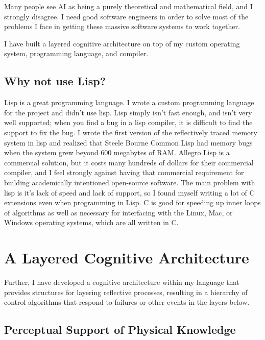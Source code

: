 Many people see AI as being a purely theoretical and mathematical
field, and I strongly disagree.  I need good software engineers in
order to solve most of the problems I face in getting these massive
software systems to work together.

I have built a layered cognitive architecture on top of my custom
operating system, programming language, and compiler.

\subsection{Why not use Lisp?}

Lisp is a great programming language.  I wrote a custom programming
language for the project and didn't use lisp.  Lisp simply isn't fast
enough, and isn't very well supported; when you find a bug in a lisp
compiler, it is difficult to find the support to fix the bug.  I wrote
the first version of the reflectively traced memory system in lisp and
realized that Steele Bourne Common Lisp had memory bugs when the
system grew beyond 600 megabytes of RAM.  Allegro Lisp is a commercial
solution, but it costs many hundreds of dollars for their commercial
compiler, and I feel strongly against having that commercial
requirement for building academically intentioned open-source
software.  The main problem with lisp is it's lack of speed and lack
of support, so I found myself writing a lot of C extensions even when
programming in Lisp.  C is good for speeding up inner loops of
algorithms as well as necessary for interfacing with the Linux, Mac,
or Windows operating systems, which are all written in C.

\section{A Layered Cognitive Architecture}

Further, I have developed a cognitive architecture within my
language that provides structures for layering reflective processes,
resulting in a hierarchy of control algorithms that respond to
failures or other events in the layers below.


\subsection{Perceptual Support of Physical Knowledge}

